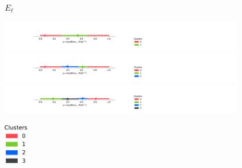 \begin{frame}{$E_\ell$}
	\centering
	\begin{changemargin}{-1cm}{-1cm}
	{
		\begin{minipage}{10cm}
			\centering
			{\includegraphics[clip, trim=4.5cm 1cm 21cm 2.0cm, height=1.3cm]{figures/from-paper/El_tanbeta_err1}}
			{\includegraphics[clip, trim=4.5cm 1cm 21cm 2.0cm, height=1.3cm]{figures/from-paper/El_tanbeta_err2}}
			{\includegraphics[clip, trim=4.5cm 1cm 21cm 2.0cm, height=1.3cm]{figures/from-paper/El_tanbeta_err3}}
	\end{minipage}
	}
	\begin{minipage}{2cm}
		\vspace{2cm}
		\includegraphics[height=1.7cm]{figures/from-paper/el_err3_legend.pdf}
	\end{minipage}
	\end{changemargin}
\end{frame}

